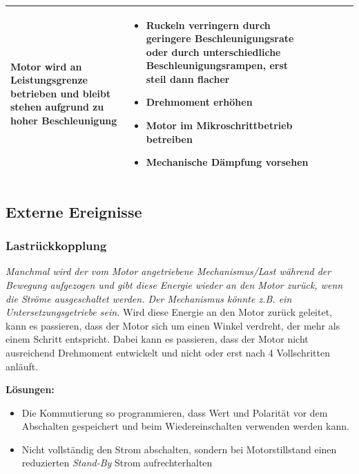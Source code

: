 {{{{\begin{center}
\begin{tabularx}{\textwidth}{|X|X|X|X|X|X|}
						Motor wird an Leistungsgrenze betrieben und bleibt stehen aufgrund zu hoher Beschleunigung & 
						\begin{itemize} 
							\item {Ruckeln verringern durch geringere Beschleunigungsrate oder durch unterschiedliche Beschleunigungsrampen, erst steil dann flacher} 
							\item {Drehmoment erhöhen} 
							\item {Motor im Mikroschrittbetrieb betreiben} 
							\item {Mechanische Dämpfung vorsehen} 
						\end{itemize}	 \\	\hline
					\end{tabularx}
				\end{center}
				
				
				
				\subsection{Externe Ereignisse}
				\subsubsection{Lastrückkopplung}
				\textit{\glqq Manchmal wird der vom Motor angetriebene Mechanismus/Last während der Bewegung \glqq aufgezogen \grqq und gibt diese Energie wieder an den Motor zurück, wenn die Ströme ausgeschaltet werden. Der Mechanismus könnte z.B. ein Untersetzungsgetriebe sein.\grqq}\cite{FaulhaberDriveSystems.2020} 
				Wird diese Energie an den Motor zurück geleitet, kann es passieren, dass der Motor sich um einen Winkel verdreht, der mehr als einem Schritt entspricht. Dabei kann es passieren, dass der Motor nicht ausreichend Drehmoment entwickelt und nicht oder erst nach 4 Vollschritten anläuft. \cite{FaulhaberDriveSystems.2020}
				
				\textbf{Lösungen:}
				\begin{itemize}
					\item Die Kommutierung so programmieren, dass Wert und Polarität vor dem Abschalten gespeichert und beim Wiedereinschalten verwenden werden kann. 
					\item Nicht vollständig den Strom abschalten, sondern bei Motorstillstand einen reduzierten \textit{Stand-By} Strom aufrechterhalten
				\end{itemize}
				
}}}}
